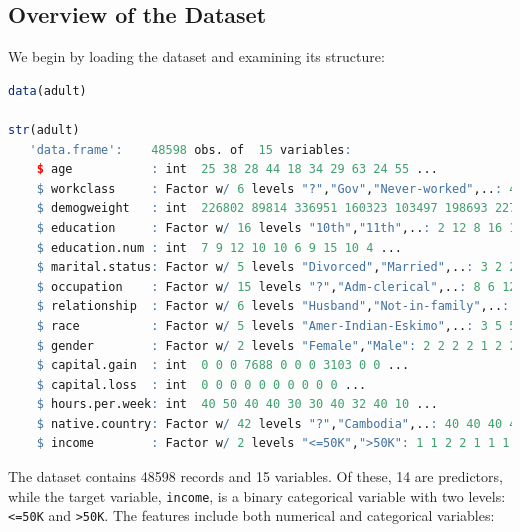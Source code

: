 \documentclass[
]{book}
\newcommand{\passthrough}[1]{#1}
\theoremstyle{definition}
\theoremstyle{definition}
\theoremstyle{definition}
\theoremstyle{definition}
\theoremstyle{remark}
\begin{document}
\subsection*{Overview of the Dataset}\label{overview-of-the-dataset-2}

We begin by loading the dataset and examining its structure:

\begin{lstlisting}[language=R]
data(adult)

str(adult)
   'data.frame':    48598 obs. of  15 variables:
    $ age           : int  25 38 28 44 18 34 29 63 24 55 ...
    $ workclass     : Factor w/ 6 levels "?","Gov","Never-worked",..: 4 4 2 4 1 4 1 5 4 4 ...
    $ demogweight   : int  226802 89814 336951 160323 103497 198693 227026 104626 369667 104996 ...
    $ education     : Factor w/ 16 levels "10th","11th",..: 2 12 8 16 16 1 12 15 16 6 ...
    $ education.num : int  7 9 12 10 10 6 9 15 10 4 ...
    $ marital.status: Factor w/ 5 levels "Divorced","Married",..: 3 2 2 2 3 3 3 2 3 2 ...
    $ occupation    : Factor w/ 15 levels "?","Adm-clerical",..: 8 6 12 8 1 9 1 11 9 4 ...
    $ relationship  : Factor w/ 6 levels "Husband","Not-in-family",..: 4 1 1 1 4 2 5 1 5 1 ...
    $ race          : Factor w/ 5 levels "Amer-Indian-Eskimo",..: 3 5 5 3 5 5 3 5 5 5 ...
    $ gender        : Factor w/ 2 levels "Female","Male": 2 2 2 2 1 2 2 2 1 2 ...
    $ capital.gain  : int  0 0 0 7688 0 0 0 3103 0 0 ...
    $ capital.loss  : int  0 0 0 0 0 0 0 0 0 0 ...
    $ hours.per.week: int  40 50 40 40 30 30 40 32 40 10 ...
    $ native.country: Factor w/ 42 levels "?","Cambodia",..: 40 40 40 40 40 40 40 40 40 40 ...
    $ income        : Factor w/ 2 levels "<=50K",">50K": 1 1 2 2 1 1 1 2 1 1 ...
\end{lstlisting}

The dataset contains 48598 records and 15 variables. Of these, 14 are predictors, while the target variable, \passthrough{\lstinline!income!}, is a binary categorical variable with two levels: \passthrough{\lstinline!<=50K!} and \passthrough{\lstinline!>50K!}. The features include both numerical and categorical variables:
\end{document}
